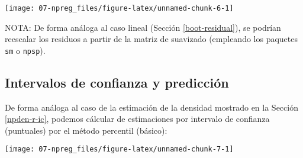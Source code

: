 \documentclass[]{book}
\newenvironment{Shaded}{\begin{snugshade}}{\end{snugshade}}
\newcommand{\KeywordTok}[1]{\textcolor[rgb]{0.13,0.29,0.53}{\textbf{#1}}}
\newcommand{\DataTypeTok}[1]{\textcolor[rgb]{0.13,0.29,0.53}{#1}}
\newcommand{\DecValTok}[1]{\textcolor[rgb]{0.00,0.00,0.81}{#1}}
\newcommand{\FloatTok}[1]{\textcolor[rgb]{0.00,0.00,0.81}{#1}}
\newcommand{\StringTok}[1]{\textcolor[rgb]{0.31,0.60,0.02}{#1}}
\newcommand{\OperatorTok}[1]{\textcolor[rgb]{0.81,0.36,0.00}{\textbf{#1}}}
\newcommand{\NormalTok}[1]{#1}
\theoremstyle{break}
\theoremstyle{definition}
\theoremstyle{definition}
\theoremstyle{definition}
\theoremstyle{remark}
\begin{document}
\begin{center}\texttt{[image: 07-npreg\_files/figure-latex/unnamed-chunk-6-1]} \end{center}

NOTA: De forma análoga al caso lineal (Sección \ref{boot-residual}), se
podrían reescalar los residuos a partir de la matriz de suavizado
(empleando los paquetes \texttt{sm} o \texttt{npsp}).

\subsection{Intervalos de confianza y
predicción}\label{intervalos-de-confianza-y-predicciuxf3n}

De forma análoga al caso de la estimación de la densidad mostrado en la
Sección \ref{npden-r-ic}, podemos cálcular de estimaciones por intervalo
de confianza (puntuales) por el método percentil (básico):

\begin{Shaded}
\end{Shaded}

\begin{center}\texttt{[image: 07-npreg\_files/figure-latex/unnamed-chunk-7-1]} \end{center}
\end{document}
